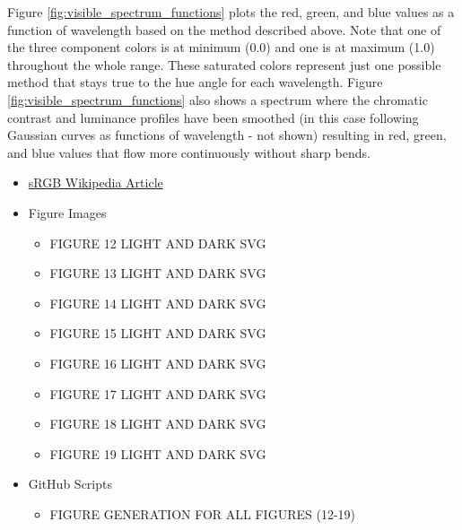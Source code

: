 \documentclass[twocolumn]{article}
\newif\ifinvert
\begin{document}
Figure \ref{fig:visible_spectrum_functions} plots the red, green, and blue values as a function of wavelength based on the method described above.  Note that one of the three component colors is at minimum (0.0) and one is at maximum (1.0) throughout the whole range.  These saturated colors represent just one possible method that stays true to the hue angle for each wavelength.  Figure \ref{fig:visible_spectrum_functions} also shows a spectrum where the chromatic contrast and luminance profiles have been smoothed (in this case following Gaussian curves as functions of wavelength - not shown) resulting in red, green, and blue values that flow more continuously without sharp bends.
\begin{figure*}[h]
    \ifinvert
        
    \else
        
    \fi
    \caption{Visible spectrum bands and the corresponding red, green, and blue values as functions of wavelengths.  The saturated spectrum is the same as that presented in Figure \ref{fig:visible_spectrum_locus} (with the more extreme wavelengths cropped out).  The smoothed spectrum was constructed with an arbitrary method that preserves the hue angle for each wavelength but otherwise smooths out the resulting functions for red, green, and blue (note that green and blue cross at the same cyan wavelength, and green and red cross at the same yellow wavelength, for both series).  IMAGE LINK, CODE LINK}\label{fig:visible_spectrum_functions}
\end{figure*}
\begin{itemize}
    \item \href{https://en.wikipedia.org/wiki/SRGB}{sRGB Wikipedia Article}
    \item Figure Images
    \begin{itemize}
        \item FIGURE 12 LIGHT AND DARK SVG
        \item FIGURE 13 LIGHT AND DARK SVG
        \item FIGURE 14 LIGHT AND DARK SVG
        \item FIGURE 15 LIGHT AND DARK SVG
        \item FIGURE 16 LIGHT AND DARK SVG
        \item FIGURE 17 LIGHT AND DARK SVG
        \item FIGURE 18 LIGHT AND DARK SVG
        \item FIGURE 19 LIGHT AND DARK SVG
    \end{itemize}
    \item GitHub Scripts
    \begin{itemize}
        \item FIGURE GENERATION FOR ALL FIGURES (12-19)
    \end{itemize}
\end{itemize}
\end{document}
